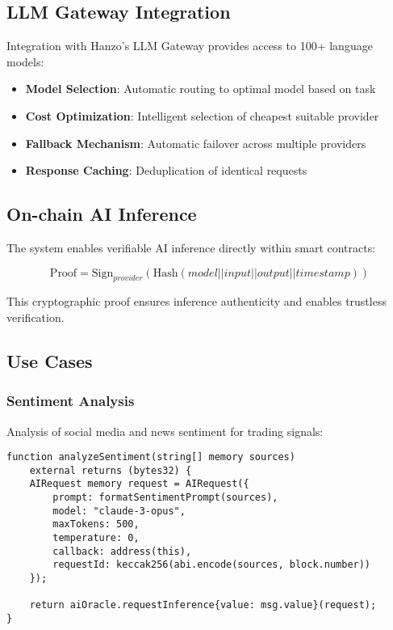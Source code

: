\documentclass[11pt]{article}
\begin{document}
\subsection{LLM Gateway Integration}

Integration with Hanzo's LLM Gateway provides access to 100+ language models:

\begin{itemize}
    \item \textbf{Model Selection}: Automatic routing to optimal model based on task
    \item \textbf{Cost Optimization}: Intelligent selection of cheapest suitable provider
    \item \textbf{Fallback Mechanism}: Automatic failover across multiple providers
    \item \textbf{Response Caching}: Deduplication of identical requests
\end{itemize}

\subsection{On-chain AI Inference}

The system enables verifiable AI inference directly within smart contracts:

\begin{equation}
\text{Proof} = \text{Sign}_{provider}(\text{Hash}(model || input || output || timestamp))
\end{equation}

This cryptographic proof ensures inference authenticity and enables trustless verification.

\subsection{Use Cases}

\subsubsection{Sentiment Analysis}
Analysis of social media and news sentiment for trading signals:

\begin{lstlisting}[caption={Sentiment Analysis Request}]
function analyzeSentiment(string[] memory sources) 
    external returns (bytes32) {
    AIRequest memory request = AIRequest({
        prompt: formatSentimentPrompt(sources),
        model: "claude-3-opus",
        maxTokens: 500,
        temperature: 0,
        callback: address(this),
        requestId: keccak256(abi.encode(sources, block.number))
    });
    
    return aiOracle.requestInference{value: msg.value}(request);
}
\end{lstlisting}
\end{document}
